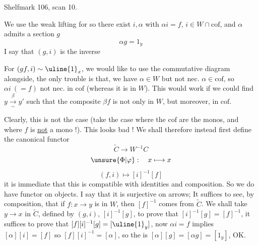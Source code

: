 Shelfmark 106, scan 10.

We use the weak lifting  for
so there exist $i,\alpha$ with $\alpha i=f$,  $i\in W\cap\mathrm{cof}$, and $\alpha$ admits a section $g$
\[\alpha g=1_y\]
I say that $(g,i)$ is the inverse  

For $(gf,i)\sim\uline{1}_x$, we would like to use the commutative diagram alongside, the only trouble is that, we have $\alpha\in W$ but not nec. $\alpha\in\mathrm{cof}$, so $\alpha i\ (=f)$ not nec. in  $\mathrm{cof}$ (whereas it is in $W$).
This would work if we could find $y\xrightarrow[\sim]{\beta}y'$  such that the composite $\beta f$ is not only in $W$, but moreover, in $\mathrm{cof}$.

Clearly, this is not  the case (take the case where the $\mathrm{cof}$ are the monos, and where $f$ is \uline{not} a mono !). This looks bad !
We shall therefore instead first define the canonical functor
\[\widetilde C\longrightarrow W^{-1}C\]
\[\unsure{\Phi|\varphi}:\quad x\longmapsto x\]
\[(f,i)\longmapsto[i]^{-1}[f]\]
it is immediate that this is compatible with identities and composition. So we do have functor   on objects. I say that it is surjective on arrows; It suffices to see, by composition, that if $f:x\longrightarrow y$ is in $W$, then $[f]^{-1}$ comes from $\widetilde C$. We shall take  $y\longrightarrow x$ in $\widetilde C$, defined by $(g,i)$,  $[i]^{-1}[g]$, to prove that $[i]^{-1}[g]=[f]^{-1}$, it suffices to prove that $[f][i]^{-1}[g]=[\uline{1}_y]$, now $\alpha i=f$ implies $[\alpha][i]=[f]$ so $[f][i]^{-1}=[\alpha]$, so the  is $[\alpha][g]=[\alpha g]=[1_y]$, OK.
